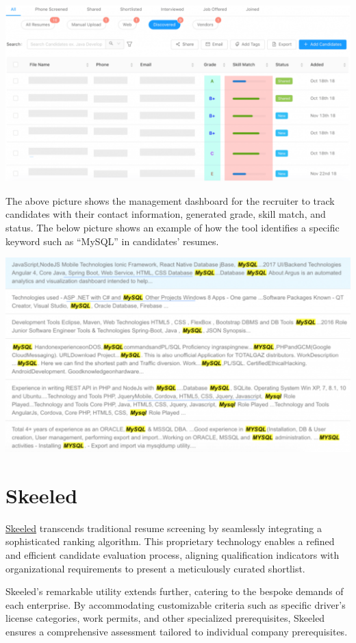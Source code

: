 \documentclass[
]{book}
\begin{document}
\includegraphics[width=5.44792in,height=\textheight]{cvviz pic 1.png}

The above picture shows the management dashboard for the recruiter to track candidates with their contact information, generated grade, skill match, and status. The below picture shows an example of how the tool identifies a specific keyword such as ``MySQL'' in candidates' resumes.

\includegraphics[width=5.36458in,height=\textheight]{cvviz pic 2.png}

\hypertarget{skeeled}{%
\section{Skeeled}\label{skeeled}}

\href{https://www.skeeled.com/services}{Skeeled} transcends traditional resume screening by seamlessly integrating a sophisticated ranking algorithm. This proprietary technology enables a refined and efficient candidate evaluation process, aligning qualification indicators with organizational requirements to present a meticulously curated shortlist.

Skeeled's remarkable utility extends further, catering to the bespoke demands of each enterprise. By accommodating customizable criteria such as specific driver's license categories, work permits, and other specialized prerequisites, Skeeled ensures a comprehensive assessment tailored to individual company prerequisites.
\end{document}
